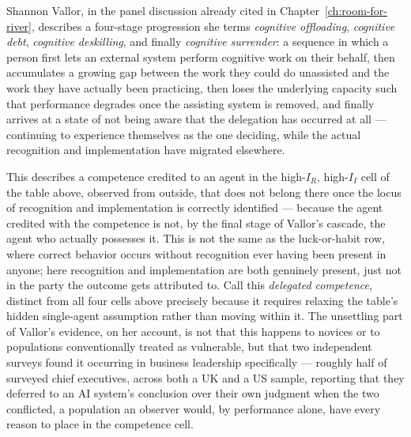 Shannon Vallor, in the panel discussion already cited in Chapter~\ref{ch:room-for-river}, describes a four-stage progression she terms \emph{cognitive offloading}, \emph{cognitive debt}, \emph{cognitive deskilling}, and finally \emph{cognitive surrender}: a sequence in which a person first lets an external system perform cognitive work on their behalf, then accumulates a growing gap between the work they could do unassisted and the work they have actually been practicing, then loses the underlying capacity such that performance degrades once the assisting system is removed, and finally arrives at a state of not being aware that the delegation has occurred at all --- continuing to experience themselves as the one deciding, while the actual recognition and implementation have migrated elsewhere.

This describes a competence credited to an agent in the high-$I_R$, high-$I_I$ cell of the table above, observed from outside, that does not belong there once the locus of recognition and implementation is correctly identified --- because the agent credited with the competence is not, by the final stage of Vallor's cascade, the agent who actually possesses it. This is not the same as the luck-or-habit row, where correct behavior occurs without recognition ever having been present in anyone; here recognition and implementation are both genuinely present, just not in the party the outcome gets attributed to. Call this \emph{delegated competence}, distinct from all four cells above precisely because it requires relaxing the table's hidden single-agent assumption rather than moving within it. The unsettling part of Vallor's evidence, on her account, is not that this happens to novices or to populations conventionally treated as vulnerable, but that two independent surveys found it occurring in business leadership specifically --- roughly half of surveyed chief executives, across both a UK and a US sample, reporting that they deferred to an AI system's conclusion over their own judgment when the two conflicted, a population an observer would, by performance alone, have every reason to place in the competence cell.
